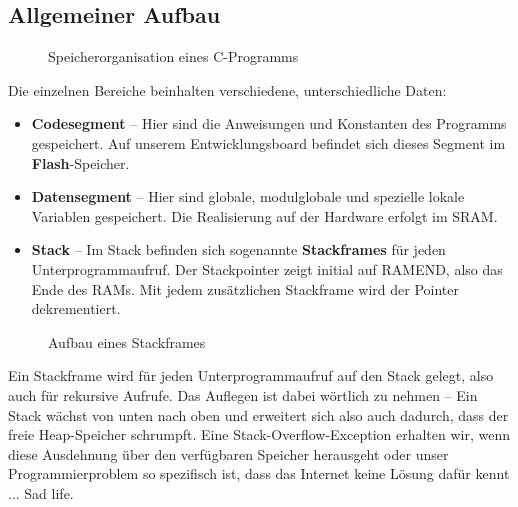 \documentclass[11pt,a4paper]{scrartcl}
\newlength{\smallestHeight}
\begin{document}
\subsection{Allgemeiner Aufbau}
\begin{figure}[h!]
\centering
{}
\caption{Speicherorganisation eines C-Programms}
\end{figure}
Die einzelnen Bereiche beinhalten verschiedene, unterschiedliche Daten:
\begin{itemize}
\item \textbf{Codesegment} -- Hier sind die Anweisungen und Konstanten des Programms gespeichert. Auf unserem Entwicklungsboard befindet sich dieses Segment im \textbf{Flash}-Speicher.
\item \textbf{Datensegment} -- Hier sind globale, modulglobale und spezielle lokale Variablen gespeichert. Die Realisierung auf der Hardware erfolgt im SRAM.
\item \textbf{Stack} -- Im Stack befinden sich sogenannte \textbf{Stackframes} für jeden Unterprogrammaufruf. Der Stackpointer zeigt initial auf RAMEND, also das Ende des RAMs. Mit jedem zusätzlichen Stackframe wird der Pointer dekrementiert.
\end{itemize}
\begin{figure}[h!]
\centering
{}
\caption{Aufbau eines Stackframes}
\end{figure}
Ein Stackframe wird für jeden Unterprogrammaufruf auf den Stack gelegt, also auch für rekursive Aufrufe. Das {\glqq}Auflegen{\grqq} ist dabei wörtlich zu nehmen -- Ein Stack wächst von unten nach oben und erweitert sich also auch dadurch, dass der freie Heap-Speicher schrumpft. Eine Stack-Overflow-Exception erhalten wir, wenn diese Ausdehnung über den verfügbaren Speicher herausgeht oder unser Programmierproblem so spezifisch ist, dass das Internet keine Lösung dafür kennt ... Sad life.
\end{document}
